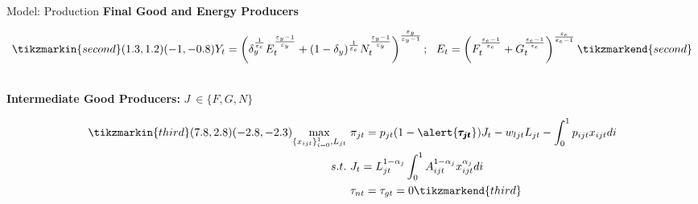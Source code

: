 \documentclass[11pt,aspectratio=169]{beamer}
\begin{document}
\begin{frame}{Model: Production}
\textbf{Final Good and Energy Producers }
\vspace{-5mm}
	\begin{minipage}[t!]{1\textwidth}
		\begin{align*}
		\tikzmarkin{second}(1.3,1.2)(-1,-0.8)
Y_t=\left(\delta_y^{\frac{1}{\varepsilon_e}}E_t^\frac{\varepsilon_y-1}{\varepsilon_y}+(1-\delta_y)^{\frac{1}{\varepsilon_e}}N_t^\frac{\varepsilon_y-1}{\varepsilon_y}\right)^\frac{\varepsilon_y}{\varepsilon_y-1}; \ \ 
E_t=\left({F}_t^\frac{\varepsilon_e-1}{\varepsilon_e}+G_t^\frac{\varepsilon_e-1}{\varepsilon_e}\right)^\frac{\varepsilon_e}{\varepsilon_e-1}
\tikzmarkend{second}
\end{align*}
	\end{minipage}
\pause
\\

\vspace{12mm}
\textbf{Intermediate Good Producers:} $J\ \in\{F,G,N\}$
	\vspace{-3mm}
\begin{minipage}[t!]{1\textwidth}
	\begin{align*}
	\tikzmarkin{third}(7.8,2.8)(-2.8,-2.3)
\underset{\{x_{ijt}\}_{i=0}^1, L_{jt}}{\max}\ & \pi_{jt}=p_{jt}(1-\alert{\pmb{\tau_{jt}}})J_t-w_{ljt}L_{jt}-\int_{0}^{1}p_{ijt}x_{ijt}di\\ 
 s.t.\ & J_{t}=L_{jt}^{1-\alpha_j}\int_{0}^{1}A^{1-\alpha_j}_{ijt}x_{ijt}^{\alpha_j}di \\
 \ & \tau_{nt}=\tau_{gt}=0
	\tikzmarkend{third}
	\end{align*}
\end{minipage}
\end{frame}
\end{document}
